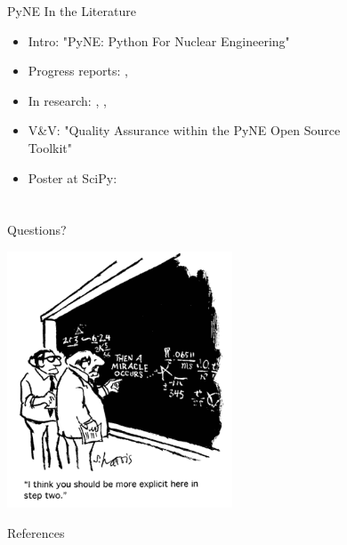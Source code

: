 \documentclass[xcolor=x11names,compress]{beamer}
\renewcommand{\(}{\begin{columns}}
\renewcommand{\)}{\end{columns}}
\newcommand{\<}[1]{\begin{column}{#1}}
\renewcommand{\>}{\end{column}}
\begin{document}
\begin{frame}[fragile]{PyNE In the Literature}

    \begin{itemize}
    \item Intro: "PyNE: Python For Nuclear Engineering" \cite{pyne_intro}
    \item Progress reports: \cite{scopatz_pyne}, \cite{pyne_progress}
    \item In research: \cite{Biondo2014}, \cite{MarquezDamian2014280}, \cite{Scopatz2013a}
    \item V\&V: "Quality Assurance within the PyNE Open Source \\Toolkit" \cite{pyne_vnv}
    \item Poster at SciPy: \cite{scipy}
    \end{itemize}
  
\end{frame}

\section*{}
\begin{frame}[fragile]{Questions?}

    \begin{center}
    \includegraphics[height=3in,clip]{../questions-comic}  
    \end{center}
  
\end{frame}
\begin{frame}[allowframebreaks]{References}
	
	
\end{frame}
\end{document}

